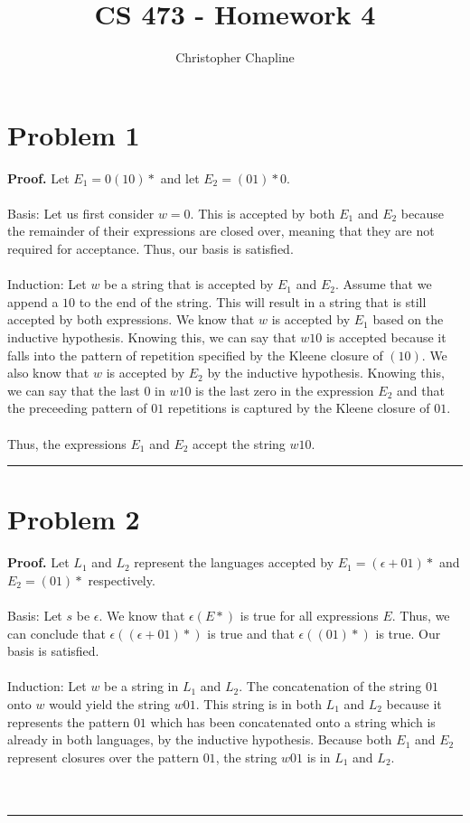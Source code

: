 \documentclass{article}%
\newenvironment{proof}[1][Proof]{\noindent\textbf{#1.} }{\ \rule{0.5em}{0.5em}}
\begin{document}
\title{CS 473 - Homework 4}
\author{Christopher Chapline}
\maketitle

\section{Problem 1}

\begin{proof}
    Let $E_1=0(10)*$ and let $E_2=(01)*0$.\\
    \\
    Basis: Let us first consider $w=0$. This is accepted by both $E_1$ and $E_2$ because the remainder of their
    expressions are closed over, meaning that they are not required for acceptance. Thus, our basis is satisfied.\\
    \\
    Induction: Let $w$ be a string that is accepted by $E_1$ and $E_2$. Assume that we append a $10$ to the end of the
    string. This will result in a string that is still accepted by both expressions. We know that $w$ is accepted by $E_1$
    based on the inductive hypothesis. Knowing this, we can say that $w10$ is accepted because it falls into the pattern of
    repetition specified by the Kleene closure of $(10)$. We also know that $w$ is accepted by $E_2$ by the inductive
    hypothesis. Knowing this, we can say that the last $0$ in $w10$ is the last zero in the expression $E_2$ and that the
    preceeding pattern of $01$ repetitions is captured by the Kleene closure of $01$.\\
    \\
    Thus, the expressions $E_1$ and $E_2$ accept the string $w10$.
\end{proof}

\section{Problem 2}

\begin{proof}
    Let $L_1$ and $L_2$ represent the languages accepted by $E_1=(\epsilon + 01)*$ and $E_2=(01)*$ respectively.\\
    \\
    Basis: Let $s$ be $\epsilon$. We know that $\epsilon(E*)$ is true for all expressions $E$. Thus, we can conclude
    that $\epsilon((\epsilon + 01)*)$ is true and that $\epsilon((01)*)$ is true. Our basis is satisfied.\\
    \\
    Induction: Let $w$ be a string in $L_1$ and $L_2$. The concatenation of the string $01$ onto $w$ would yield the string
    $w01$. This string is in both $L_1$ and $L_2$ because it represents the pattern $01$ which has been concatenated onto a
    string which is already in both languages, by the inductive hypothesis. Because both $E_1$ and $E_2$ represent closures
    over the pattern $01$, the string $w01$ is in $L_1$ and $L_2$.\\
    \\
\end{proof}
\end{document}

